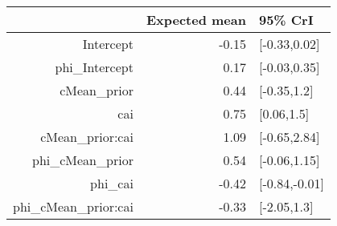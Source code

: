 \begin{tabular}{rrl}
  \hline
 & Expected mean & 95\% CrI \\ 
  \hline
Intercept & -0.15 & [-0.33,0.02] \\ 
  phi\_Intercept & 0.17 & [-0.03,0.35] \\ 
  cMean\_prior & 0.44 & [-0.35,1.2] \\ 
  cai & 0.75 & [0.06,1.5] \\ 
  cMean\_prior:cai & 1.09 & [-0.65,2.84] \\ 
  phi\_cMean\_prior & 0.54 & [-0.06,1.15] \\ 
  phi\_cai & -0.42 & [-0.84,-0.01] \\ 
  phi\_cMean\_prior:cai & -0.33 & [-2.05,1.3] \\ 
   \hline
\end{tabular}

